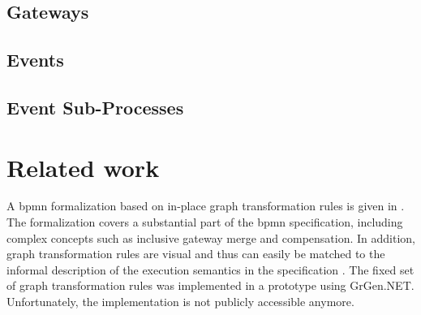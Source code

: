 \documentclass[adraft, copyright, creativecommons]{eptcs} %
\begin{document}
\subsection{Gateways}
\subsection{Events}

\subsection{Event Sub-Processes}

\section{Related work}

A \gls*{bpmn} formalization based on in-place graph transformation rules is given in \cite{vangorpVisualTokenbasedFormalization2013}.
The formalization covers a substantial part of the \gls*{bpmn} specification, including complex concepts such as inclusive gateway merge and compensation.
In addition, graph transformation rules are visual and thus can easily be matched to the informal description of the execution semantics in the specification \cite{objectmanagementgroupBusinessProcessModel2013}.
The fixed set of graph transformation rules was implemented in a prototype using GrGen.NET.
Unfortunately, the implementation is not publicly accessible anymore.
\end{document}
